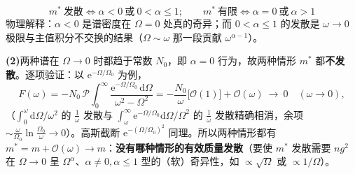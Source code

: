 \begin{equation*}
\boxed{\;m^*\ \text{发散}\iff \alpha<0\ \text{或}\ 0<\alpha\le1;\qquad
m^*\ \text{有限}\iff \alpha=0\ \text{或}\ \alpha>1\;}
\end{equation*}
物理解释：$\alpha<0$ 是谱密度在 $\Omega=0$ 处真的奇异；而 $0<\alpha\le1$ 的发散是 $\omega\to0$ 极限与主值积分不交换的结果（$\Omega\sim\omega$ 那一段贡献 $\omega^{\alpha-1}$）。

\textbf{(2)}两种谱在 $\Omega\to0$ 时都趋于常数 $N_0$，即 $\alpha=0$ 行为，故两种情形 $m^*$ 都\textbf{不发散}。逐项验证：以 $\mathrm{e}^{-\Omega/\Omega_0}$ 为例，
\begin{equation*}
F(\omega)=-N_0\,\mathcal P\!\int_0^\infty\frac{\mathrm{e}^{-\Omega/\Omega_0}\,\mathrm{d}\Omega}{\omega^2-\Omega^2}
=-\frac{N_0}{\omega}\Big[\mathcal O(1)\Big]+\mathcal O(\omega)\ \to\ 0\quad(\omega\to0),
\end{equation*}
（$\int_0^\omega\mathrm{d}\Omega/\omega^2$ 的 $\frac1\omega$ 发散与 $\int_\omega^\infty\mathrm{e}^{-\Omega/\Omega_0}\mathrm{d}\Omega/\Omega^2$ 的 $\frac1\omega$ 发散精确相消，余项 $\sim\frac{\omega}{\Omega_0}\ln\frac{\Omega_0}{\omega}\to0$）。高斯截断 $\mathrm{e}^{-(\Omega/\Omega_0)^2}$ 同理。所以两种情形都有 $m^*=m+\mathcal O(\omega)\to m$：\textbf{没有哪种情形的有效质量发散}（要使 $m^*$ 发散需要 $n g^2$ 在 $\Omega\to0$ 呈 $\Omega^\alpha$、$\alpha\neq0,\alpha\le1$ 型的（软）奇异性，如 $\propto\sqrt\Omega$ 或 $\propto1/\Omega$）。

